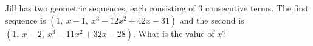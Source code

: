 Jill has two geometric sequences, each consisting of $3$ consecutive terms. The first sequence is $\left(1,\ x-1,\ x^3-12x^2+42x-31\right)$ and the second is $\left(1,\ x-2,\ x^3-11x^2+32x-28\right)$. What is the value of $x$?
